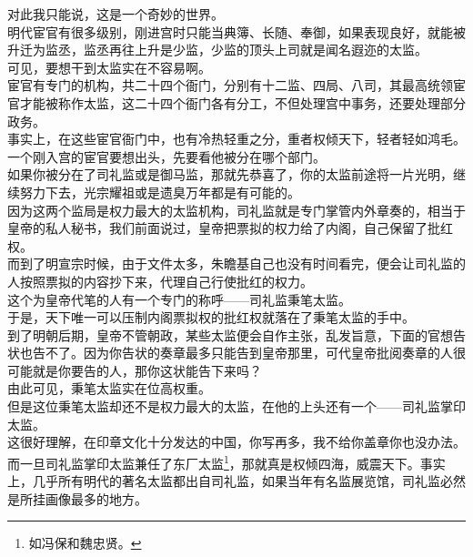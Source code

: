 \begin{multicols}{\theparacolNo}
对此我只能说，这是一个奇妙的世界。\\

明代宦官有很多级别，刚进宫时只能当典簿、长随、奉御，如果表现良好，就能被升迁为监丞，监丞再往上升是少监，少监的顶头上司就是闻名遐迩的太监。\\

可见，要想干到太监实在不容易啊。\\

宦官有专门的机构，共二十四个衙门，分别有十二监、四局、八司，其最高统领宦官才能被称作太监，这二十四个衙门各有分工，不但处理宫中事务，还要处理部分政务。\\

事实上，在这些宦官衙门中，也有冷热轻重之分，重者权倾天下，轻者轻如鸿毛。一个刚入宫的宦官要想出头，先要看他被分在哪个部门。\\

如果你被分在了司礼监或是御马监，那就先恭喜了，你的太监前途将一片光明，继续努力下去，光宗耀祖或是遗臭万年都是有可能的。\\

因为这两个监局是权力最大的太监机构，司礼监就是专门掌管内外章奏的，相当于皇帝的私人秘书，我们前面说过，皇帝把票拟的权力给了内阁，自己保留了批红权。\\

而到了明宣宗时候，由于文件太多，朱瞻基自己也没有时间看完，便会让司礼监的人按照票拟的内容抄下来，代理自己行使批红的权力。\\

这个为皇帝代笔的人有一个专门的称呼——司礼监秉笔太监。\\

于是，天下唯一可以压制内阁票拟权的批红权就落在了秉笔太监的手中。\\

到了明朝后期，皇帝不管朝政，某些太监便会自作主张，乱发旨意，下面的官想告状也告不了。因为你告状的奏章最多只能告到皇帝那里，可代皇帝批阅奏章的人很可能就是你要告的人，那你这状能告下来吗？\\

由此可见，秉笔太监实在位高权重。\\

但是这位秉笔太监却还不是权力最大的太监，在他的上头还有一个——司礼监掌印太监。\\

这很好理解，在印章文化十分发达的中国，你写再多，我不给你盖章你也没办法。\\

而一旦司礼监掌印太监兼任了东厂太监\footnote{如冯保和魏忠贤。}，那就真是权倾四海，威震天下。事实上，几乎所有明代的著名太监都出自司礼监，如果当年有名监展览馆，司礼监必然是所挂画像最多的地方。\\


\end{multicols}
